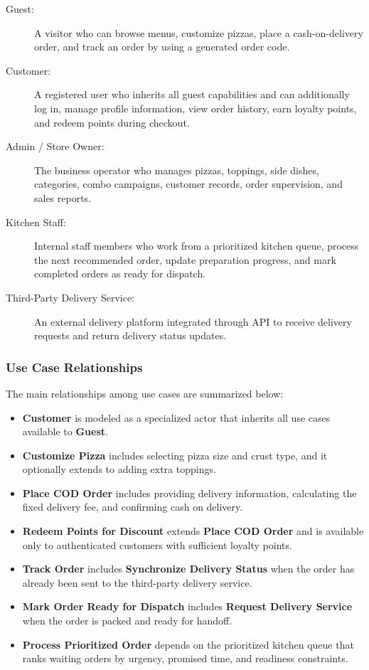 \begin{description}
    \item[Guest:] A visitor who can browse menus, customize pizzas, place a cash-on-delivery order, and track an order by using a generated order code.
    \item[Customer:] A registered user who inherits all guest capabilities and can additionally log in, manage profile information, view order history, earn loyalty points, and redeem points during checkout.
    \item[Admin / Store Owner:] The business operator who manages pizzas, toppings, side dishes, categories, combo campaigns, customer records, order supervision, and sales reports.
    \item[Kitchen Staff:] Internal staff members who work from a prioritized kitchen queue, process the next recommended order, update preparation progress, and mark completed orders as ready for dispatch.
    \item[Third-Party Delivery Service:] An external delivery platform integrated through API to receive delivery requests and return delivery status updates.
\end{description}

\subsubsection{Use Case Relationships}

The main relationships among use cases are summarized below:

\begin{itemize}
    \item \textbf{Customer} is modeled as a specialized actor that inherits all use cases available to \textbf{Guest}.
    \item \textbf{Customize Pizza} includes selecting pizza size and crust type, and it optionally extends to adding extra toppings.
    \item \textbf{Place COD Order} includes providing delivery information, calculating the fixed delivery fee, and confirming cash on delivery.
    \item \textbf{Redeem Points for Discount} extends \textbf{Place COD Order} and is available only to authenticated customers with sufficient loyalty points.
    \item \textbf{Track Order} includes \textbf{Synchronize Delivery Status} when the order has already been sent to the third-party delivery service.
    \item \textbf{Mark Order Ready for Dispatch} includes \textbf{Request Delivery Service} when the order is packed and ready for handoff.
    \item \textbf{Process Prioritized Order} depends on the prioritized kitchen queue that ranks waiting orders by urgency, promised time, and readiness constraints.
\end{itemize}


